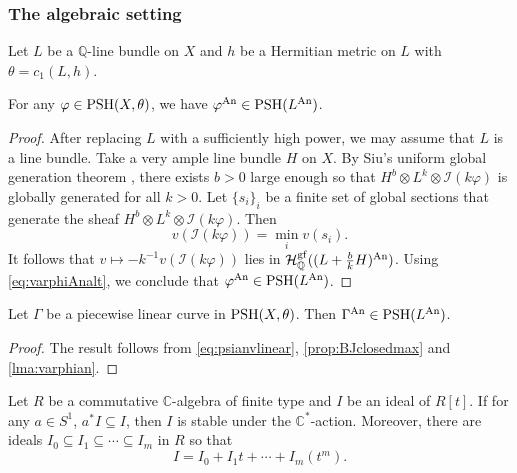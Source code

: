 \subsubsection{The algebraic setting}
\label{subsubsec:analytic_alg}

Let $L$ be a $\mathbb{Q}$-line bundle on $X$ and $h$ be a Hermitian metric on $L$ with $\theta=c_1(L,h)$.



\begin{lemma}\label{lma:varphian}
For any $\varphi\in \mathrm{PSH}(X,\theta)$, we have $\varphi^{\mathrm{An}}\in \mathrm{PSH}(L^{\mathrm{An}})$.
\end{lemma}
\begin{proof}
After replacing $L$ with a sufficiently high power, we may assume that $L$ is a line bundle. Take a very ample line bundle $H$ on $X$.
By Siu's uniform global generation theorem \cite{Siu98}, \cite[Theorem~6.27]{Dem12} there exists $b>0$ large enough so that $H^{b}\otimes L^k\otimes \mathcal{I}(k\varphi)$ is globally generated for all $k>0$. Let $\{s_i\}_i$ be a finite set of global sections that generate the sheaf $H^{b}\otimes L^k\otimes \mathcal{I}(k\varphi)$. Then
\[
v(\mathcal{I}(k\varphi))=\min_i v(s_i).
\]
It follows that $v\mapsto -k^{-1}v\left(\mathcal{I}(k\varphi) \right)$ lies in $\mathcal{H}^{\mathrm{gf}}_{\mathbb{Q}}((L+\frac{b}{k}H)^{\mathrm{An}})$. Using \eqref{eq:varphiAnalt}, we conclude that $\varphi^{\mathrm{An}}\in \mathrm{PSH}(L^{\mathrm{An}})$.
\end{proof}


\begin{lemma}\label{lma:pltest}
Let $\Gamma$ be a piecewise linear curve in $\mathrm{PSH}(X,\theta)$.
Then $\Gamma^{\mathrm{An}}\in \mathrm{PSH}(L^{\mathrm{An}})$.
\end{lemma}
\begin{proof}  The result follows from \eqref{eq:psianvlinear}, \cref{prop:BJclosedmax} and \cref{lma:varphian}.
\end{proof}

\begin{lemma}\label{lma:istab}
Let $R$ be a commutative $\mathbb{C}$-algebra of finite type and $I$ be an ideal of $ R[t]$. If for any $a\in S^1$, $a^*I\subseteq I$, then $I$ is stable under the $\mathbb C^*$-action. Moreover, there are ideals $I_0\subseteq I_1\subseteq \cdots \subseteq I_m$ in $R$ so that
\begin{equation}\label{eq:Iexp}
    I=I_0 + I_1t+ \cdots + I_m (t^m).
    \end{equation}
\end{lemma}

